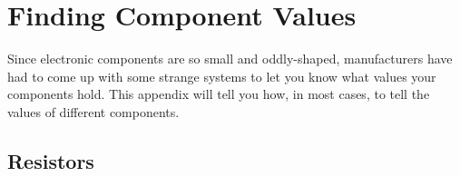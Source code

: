 \chapter{Finding Component Values}

Since electronic components are so small and oddly-shaped, manufacturers have had to come up with some strange systems to let you know what values your components hold.
This appendix will tell you how, in most cases, to tell the values of different components.

\section{Resistors}
\label{appendixResistorValues}
